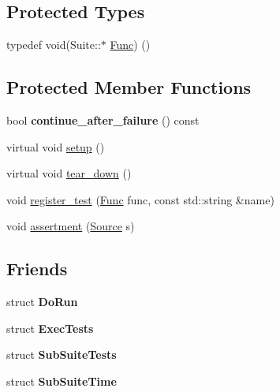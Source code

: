 \subsection*{Protected Types}
\begin{DoxyCompactItemize}
\item 
typedef void(Suite\+::$\ast$ \hyperlink{class_test_1_1_suite_a87c40a9c763fc3221bee0e70c431038f}{Func}) ()
\end{DoxyCompactItemize}
\subsection*{Protected Member Functions}
\begin{DoxyCompactItemize}
\item 
bool {\bfseries continue\+\_\+after\+\_\+failure} () const \hypertarget{class_test_1_1_suite_a76d5fbd5dafa352f6086f8ab0db3089f}{}\label{class_test_1_1_suite_a76d5fbd5dafa352f6086f8ab0db3089f}

\item 
virtual void \hyperlink{class_test_1_1_suite_afb4c733e6c46a011818bb02f2e8d5bb8}{setup} ()
\item 
virtual void \hyperlink{class_test_1_1_suite_a37d3595625cff09b8e43bf6c414ff610}{tear\+\_\+down} ()
\item 
void \hyperlink{class_test_1_1_suite_a11e542d1d45905b817b00c35660700b9}{register\+\_\+test} (\hyperlink{class_test_1_1_suite_a87c40a9c763fc3221bee0e70c431038f}{Func} func, const std\+::string \&name)
\item 
void \hyperlink{class_test_1_1_suite_a1851ad75aed6141a19a06eeeb0fe0d3c}{assertment} (\hyperlink{class_test_1_1_source}{Source} s)
\end{DoxyCompactItemize}
\subsection*{Friends}
\begin{DoxyCompactItemize}
\item 
struct {\bfseries Do\+Run}\hypertarget{class_test_1_1_suite_a843435d7ee79d23ed13e6eec5c7ac6bb}{}\label{class_test_1_1_suite_a843435d7ee79d23ed13e6eec5c7ac6bb}

\item 
struct {\bfseries Exec\+Tests}\hypertarget{class_test_1_1_suite_ab4730d33c1241aba407b71f8eafb7bcc}{}\label{class_test_1_1_suite_ab4730d33c1241aba407b71f8eafb7bcc}

\item 
struct {\bfseries Sub\+Suite\+Tests}\hypertarget{class_test_1_1_suite_a901d2d72cc93e087c94d99680f65fa8e}{}\label{class_test_1_1_suite_a901d2d72cc93e087c94d99680f65fa8e}

\item 
struct {\bfseries Sub\+Suite\+Time}\hypertarget{class_test_1_1_suite_a5933776e455e5bd9ad1d4a8b1c591aa2}{}\label{class_test_1_1_suite_a5933776e455e5bd9ad1d4a8b1c591aa2}

\end{DoxyCompactItemize}


